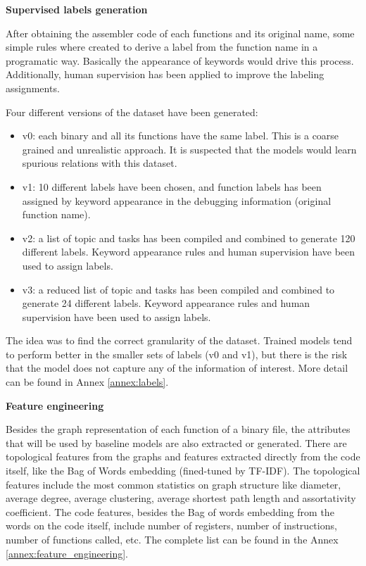 \textbf{Supervised labels generation}

After obtaining the assembler code of each functions and its original name, some simple rules where created to derive a label from the function name in a programatic way. Basically the appearance of keywords would drive this process. Additionally, human supervision has been applied to improve the labeling assignments. 

Four different versions of the dataset have been generated:
\begin{itemize}
	\item v0: each binary and all its functions have the same label. This is a coarse grained and unrealistic approach. It is suspected that the models would learn spurious relations with this dataset.
	\item v1: 10 different labels have been chosen, and function labels has been assigned by keyword appearance in the debugging information (original function name).
	\item v2: a list of topic and tasks has been compiled and combined to generate 120 different labels. Keyword appearance rules and human supervision have been used to assign labels.
	\item v3: a reduced list of topic and tasks has been compiled and combined to generate 24 different labels. Keyword appearance rules and human supervision have been used to assign labels.
\end{itemize}
The idea was to find the correct granularity of the dataset. Trained models tend to perform better in the smaller sets of labels (v0 and v1), but there is the risk that the model does not capture any of the information of interest. More detail can be found in Annex \ref{annex:labels}.





\textbf{Feature engineering}


Besides the graph representation of each function of a binary file, the attributes that will be used by baseline models are also extracted or generated. There are topological features from the graphs and features extracted directly from the code itself, like the Bag of Words embedding (fined-tuned by TF-IDF). The topological features include the most common statistics on graph structure like diameter, average degree, average clustering, average shortest path length and assortativity coefficient. The code features, besides the Bag of words embedding from the words on the code itself, include number of registers, number of instructions, number of functions called, etc. The complete list can be found in the Annex \ref{annex:feature_engineering}.


